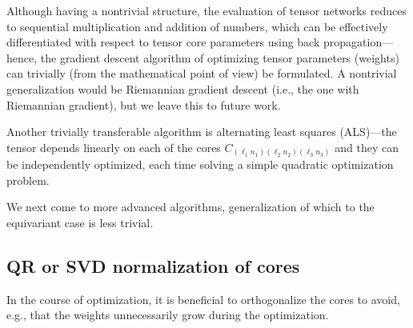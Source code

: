 Although having a nontrivial structure, the evaluation of tensor networks reduces to sequential multiplication and addition of numbers, which can be effectively differentiated with respect to tensor core parameters using back propagation---hence, the gradient descent algorithm of optimizing tensor parameters (weights) can trivially (from the mathematical point of view) be formulated.
A nontrivial generalization would be Riemannian gradient descent (i.e., the one with Riemannian gradient), but we leave this to future work.

Another trivially transferable algorithm is alternating least squares (ALS)---the tensor depends linearly on each of the cores $C_{(\ell_1 n_1)(\ell_2 n_2)(\ell_3 n_3)}$ and they can be independently optimized, each time solving a simple quadratic optimization problem.

We next come to more advanced algorithms, generalization of which to the equivariant case is less trivial.

\subsection{QR or SVD normalization of cores}

In the course of optimization, it is beneficial to orthogonalize the cores to avoid, e.g., that the weights unnecessarily grow during the optimization.

